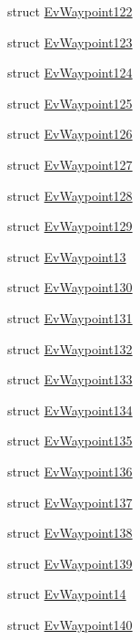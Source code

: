 \begin{DoxyCompactItemize}
struct \hyperlink{structcl__move__base__z_1_1EvWaypoint122}{Ev\+Waypoint122}
\item 
struct \hyperlink{structcl__move__base__z_1_1EvWaypoint123}{Ev\+Waypoint123}
\item 
struct \hyperlink{structcl__move__base__z_1_1EvWaypoint124}{Ev\+Waypoint124}
\item 
struct \hyperlink{structcl__move__base__z_1_1EvWaypoint125}{Ev\+Waypoint125}
\item 
struct \hyperlink{structcl__move__base__z_1_1EvWaypoint126}{Ev\+Waypoint126}
\item 
struct \hyperlink{structcl__move__base__z_1_1EvWaypoint127}{Ev\+Waypoint127}
\item 
struct \hyperlink{structcl__move__base__z_1_1EvWaypoint128}{Ev\+Waypoint128}
\item 
struct \hyperlink{structcl__move__base__z_1_1EvWaypoint129}{Ev\+Waypoint129}
\item 
struct \hyperlink{structcl__move__base__z_1_1EvWaypoint13}{Ev\+Waypoint13}
\item 
struct \hyperlink{structcl__move__base__z_1_1EvWaypoint130}{Ev\+Waypoint130}
\item 
struct \hyperlink{structcl__move__base__z_1_1EvWaypoint131}{Ev\+Waypoint131}
\item 
struct \hyperlink{structcl__move__base__z_1_1EvWaypoint132}{Ev\+Waypoint132}
\item 
struct \hyperlink{structcl__move__base__z_1_1EvWaypoint133}{Ev\+Waypoint133}
\item 
struct \hyperlink{structcl__move__base__z_1_1EvWaypoint134}{Ev\+Waypoint134}
\item 
struct \hyperlink{structcl__move__base__z_1_1EvWaypoint135}{Ev\+Waypoint135}
\item 
struct \hyperlink{structcl__move__base__z_1_1EvWaypoint136}{Ev\+Waypoint136}
\item 
struct \hyperlink{structcl__move__base__z_1_1EvWaypoint137}{Ev\+Waypoint137}
\item 
struct \hyperlink{structcl__move__base__z_1_1EvWaypoint138}{Ev\+Waypoint138}
\item 
struct \hyperlink{structcl__move__base__z_1_1EvWaypoint139}{Ev\+Waypoint139}
\item 
struct \hyperlink{structcl__move__base__z_1_1EvWaypoint14}{Ev\+Waypoint14}
\item 
struct \hyperlink{structcl__move__base__z_1_1EvWaypoint140}{Ev\+Waypoint140}
\item 

\end{DoxyCompactItemize}

